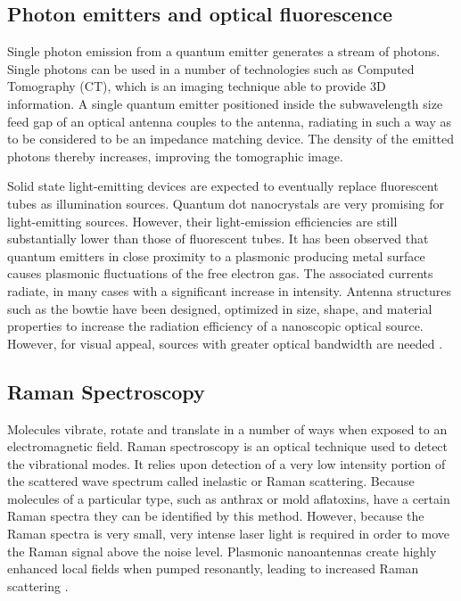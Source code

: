 \subsection{Photon emitters and optical fluorescence}
%
Single photon emission from a quantum emitter generates a stream of photons. Single photons can be used in a number of technologies such as Computed Tomography (CT), which is an imaging technique able to provide 3D information. A single quantum emitter positioned inside the subwavelength size feed gap of an optical antenna couples to the antenna, radiating in such a way as to be considered to be an impedance matching device. The density of the emitted photons thereby increases, improving the tomographic image.

Solid state light-emitting devices are expected to eventually replace fluorescent tubes as illumination sources. Quantum dot nanocrystals are very promising for light-emitting sources. However, their light-emission efficiencies are still substantially lower than those of fluorescent tubes. It has been observed that quantum emitters in close proximity to a plasmonic producing metal surface causes plasmonic fluctuations of the free electron gas. The associated currents radiate, in many cases with a significant increase in intensity. Antenna structures such as the bowtie have been designed, optimized in size, shape, and material properties to increase the radiation efficiency of a nanoscopic optical source. However, for visual appeal, sources with greater optical bandwidth are needed \cite{farahani,Curto2010}.
\subsection{Raman Spectroscopy}
%
Molecules vibrate, rotate and translate in a number of ways when exposed to an electromagnetic field. Raman spectroscopy is an optical technique used to detect the vibrational modes. It relies upon detection of a very low intensity portion of the scattered wave spectrum called inelastic or Raman scattering. Because molecules of a particular type, such as anthrax or mold aflatoxins, have a certain Raman spectra they can be identified by this method. However, because the Raman spectra is very small, very intense laser light is required in order to move the Raman signal above the noise level. Plasmonic nanoantennas create highly enhanced local fields when pumped resonantly, leading to increased Raman scattering \cite{Felidj2003}.

